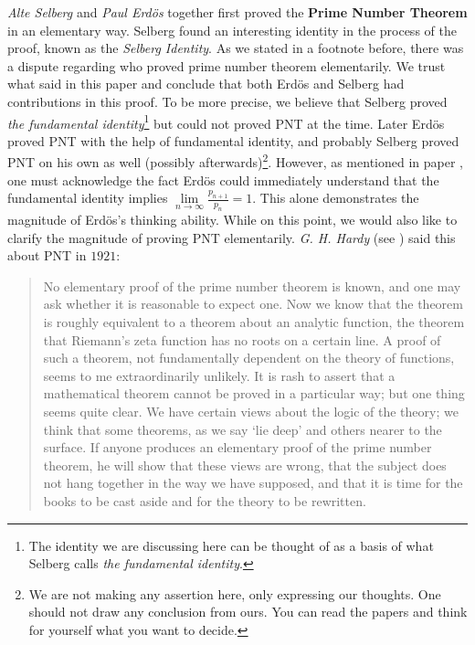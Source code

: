 \documentclass{subfile}
\begin{document}
	\textit{Alte Selberg} and \textit{Paul Erd\" os} together first proved the \textbf{Prime Number Theorem} in an elementary way. Selberg found an interesting identity in the process of the proof, known as the \textit{Selberg Identity}. As we stated in a footnote before, there was a dispute regarding who proved prime number theorem elementarily. We trust what \textcite{goldfeld_2004} said in this paper and conclude that both Erd\" os and Selberg had contributions in this proof. To be more precise, we believe that Selberg proved \textit{the fundamental identity}\footnote{The identity we are discussing here can be thought of as a basis of what Selberg calls \textit{the fundamental identity}.} but could not proved PNT at the time. Later Erd\" os proved PNT with the help of fundamental identity, and probably Selberg proved PNT on his own as well (possibly afterwards)\footnote{We are not making any assertion here, only expressing our thoughts. One should not draw any conclusion from ours. You can read the papers and think for yourself what you want to decide.}. However, as mentioned in paper \textcite[Page $6$]{goldfeld_2004}, one must acknowledge the fact Erd\" os could immediately understand that the fundamental identity implies $\lim\limits_{n\to\infty}\frac{p_{n+1}}{p_n}=1$. This alone demonstrates the magnitude of Erd\" os's thinking ability. While on this point, we would also like to clarify the magnitude of proving PNT elementarily. \textit{G. H. Hardy} (see \textcite[Page $3$]{goldfeld_2004}) said this about PNT in $1921$:
		\begin{quote}
			No elementary proof of the prime number theorem is known, and one may ask whether it is reasonable to expect one. Now we know that the theorem is roughly equivalent to a theorem about an analytic function, the theorem that Riemann's zeta function has no roots on a certain line. A proof of such a theorem, not fundamentally dependent on the theory of functions, seems to me extraordinarily unlikely. It is rash to assert that a mathematical theorem cannot be proved in a particular way; but one thing seems quite clear. We have certain views about the logic of the theory; we think that some theorems, as we say `lie deep' and others nearer to the surface. If anyone produces an elementary proof of the prime number theorem, he will show that these views are wrong, that the subject does not hang together in the way we have supposed, and that it is time for the books to be cast aside and for the theory to be rewritten.
		\end{quote}
\end{document}
